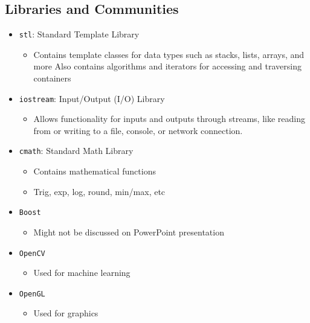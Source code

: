 \subsection{Libraries and Communities \cite{simplilearn_what_2021}}
\begin{itemize}
	\item \texttt{stl}: Standard Template Library
	\begin{itemize}
		\item Contains template classes for data types such as stacks, lists, arrays, and more
		Also contains algorithms and iterators for accessing and traversing containers
	\end{itemize}

	\item  \texttt{iostream}: Input/Output (I/O) Library
	\begin{itemize}
		\item Allows functionality for inputs and outputs through streams, like reading from or writing to a file, console, or network connection.
	\end{itemize}
	
	\item  \texttt{cmath}: Standard Math Library
	\begin{itemize}
		\item Contains mathematical functions
		\item Trig, exp, log, round, min/max, etc
	\end{itemize}
	
	\item  \texttt{Boost} 
	\begin{itemize}
		\item Might not be discussed on PowerPoint presentation
	\end{itemize}

	\item  \texttt{OpenCV}
	\begin{itemize}
		\item Used for machine learning
	\end{itemize}
	
	\item  \texttt{OpenGL}
	\begin{itemize}
		\item Used for graphics
	\end{itemize}
\end{itemize}
